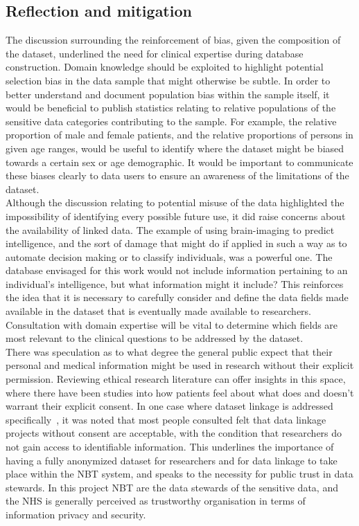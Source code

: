 \documentclass{article}
\begin{document}
\subsection{Reflection and mitigation}
 
The discussion surrounding the reinforcement of bias, given the
composition of the dataset, underlined the need for clinical expertise
during database construction. Domain knowledge should be exploited to
highlight potential selection bias in the data sample that might
otherwise be subtle. In order to better understand and document
population bias within the sample itself, it would be beneficial to
publish statistics relating to relative populations of the sensitive data
categories contributing to the sample. For example, the relative
proportion of male and female patients, and the relative proportions
of persons in given age ranges, would be useful to identify where the dataset might be biased towards a certain
sex or age demographic.
It would be important to communicate these biases clearly to data
users to ensure an awareness of the limitations of the dataset.\\
 
Although the discussion relating to potential misuse of the data
highlighted the impossibility of identifying every possible future
use, it did raise concerns about the availability of linked data.
The example of using brain-imaging to predict intelligence, and the
sort of damage that might do if applied in such a way as to automate
decision making or to classify individuals, was a powerful one. The
database envisaged for this work would not include information
pertaining to an individual's intelligence, but what information might
it include? This reinforces the idea that it is necessary to carefully
consider and define the data fields made available in the dataset that
is eventually made available to researchers. Consultation with
domain expertise will be vital to determine which fields are most
relevant to the clinical questions to be addressed by the dataset.\\

There was speculation as to what degree the general public expect that
their personal and medical information might be used in research
without their explicit permission. Reviewing ethical research
literature can offer insights in this space, where there have been
studies into how patients feel about what does and doesn't warrant
their explicit consent. In one case where dataset linkage is addressed
specifically~\cite{xafis}, it was noted that most people consulted
felt that data linkage projects without consent are acceptable,
with the condition that researchers do not gain access to identifiable
information. This underlines the importance of having a fully
anonymized dataset for researchers and for data linkage to take place
within the NBT system, and speaks to the necessity for public trust in data
stewards. In this project NBT are the data stewards of the sensitive
data, and the NHS is generally perceived as trustworthy organisation in terms
of information privacy and security.  \\
\end{document}
